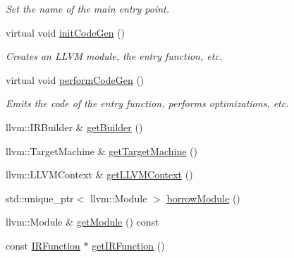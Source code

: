 \begin{DoxyCompactItemize}
\begin{DoxyCompactList}\small\item\em Set the name of the main entry point. \end{DoxyCompactList}\item 
\mbox{\label{classglow_1_1_l_l_v_m_i_r_gen_ae6c3fef79f9e5fbb73ee60dc0f674a72}} 
virtual void \hyperlink{classglow_1_1_l_l_v_m_i_r_gen_ae6c3fef79f9e5fbb73ee60dc0f674a72}{init\+Code\+Gen} ()
\begin{DoxyCompactList}\small\item\em Creates an L\+L\+VM module, the entry function, etc. \end{DoxyCompactList}\item 
\mbox{\label{classglow_1_1_l_l_v_m_i_r_gen_ae535df4df4e4181344a7be894cfdb5d9}} 
virtual void \hyperlink{classglow_1_1_l_l_v_m_i_r_gen_ae535df4df4e4181344a7be894cfdb5d9}{perform\+Code\+Gen} ()
\begin{DoxyCompactList}\small\item\em Emits the code of the entry function, performs optimizations, etc. \end{DoxyCompactList}\item 
llvm\+::\+I\+R\+Builder \& \hyperlink{classglow_1_1_l_l_v_m_i_r_gen_a9aa6667b0dbd8911e385ceff4af57799}{get\+Builder} ()
\item 
llvm\+::\+Target\+Machine \& \hyperlink{classglow_1_1_l_l_v_m_i_r_gen_a36b7ddfbe2a68673d396ab06b10baf0e}{get\+Target\+Machine} ()
\item 
llvm\+::\+L\+L\+V\+M\+Context \& \hyperlink{classglow_1_1_l_l_v_m_i_r_gen_a07a0810110612b078218a35bb4673c99}{get\+L\+L\+V\+M\+Context} ()
\item 
std\+::unique\+\_\+ptr$<$ llvm\+::\+Module $>$ \hyperlink{classglow_1_1_l_l_v_m_i_r_gen_aa5019f4a96a599dac11b3d8eb2886a26}{borrow\+Module} ()
\item 
llvm\+::\+Module \& \hyperlink{classglow_1_1_l_l_v_m_i_r_gen_a2d7e8150f5ab8f631a26711c39d00a3d}{get\+Module} () const
\item 
const \hyperlink{classglow_1_1_i_r_function}{I\+R\+Function} $\ast$ \hyperlink{classglow_1_1_l_l_v_m_i_r_gen_afe99ac3179cc752f0d1acbad9676213e}{get\+I\+R\+Function} ()
\item 
\mbox{\label{classglow_1_1_l_l_v_m_i_r_gen_af9be8ef572613c2d6d0acbc30a41439e}} 

\end{DoxyCompactItemize}
